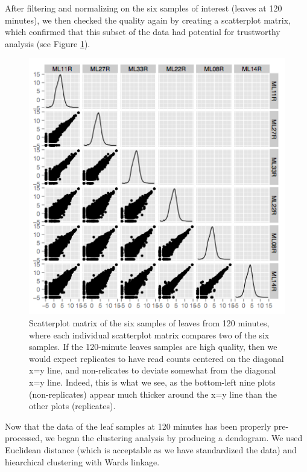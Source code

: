 \documentclass[11pt,a4paper,oldfontcommands,openany]{memoir}
\numberwithin{equation}{section} %
\begin{document}
After filtering and normalizing on the six samples of interest (leaves at 120 minutes), we then checked the quality again by creating a scatterplot matrix, which confirmed that this subset of the data had potential for trustworthy analysis (see Figure \ref{fig:L120scatter}).

\begin{figure}[H]
    \begin{framed}
    \centering
    \includegraphics[width=\textwidth]{L120scatter}
    \end{framed}
    \caption{Scatterplot matrix of the six samples of leaves from 120 minutes, where each individual scatterplot matrix compares two of the six samples. If the 120-minute leaves samples are high quality, then we would expect replicates to have read counts centered on the diagonal x=y line, and non-relicates to deviate somewhat from the diagonal x=y line. Indeed, this is what we see, as the bottom-left nine plots (non-replicates) appear much thicker around the x=y line than the other plots (replicates).}
    \label{fig:L120scatter}
\end{figure}

Now that the data of the leaf samples at 120 minutes has been properly pre-processed, we began the clustering analysis by producing a dendogram. We used Euclidean distance (which is acceptable as we have standardized the data) and hiearchical clustering with Wards linkage.
\end{document}
